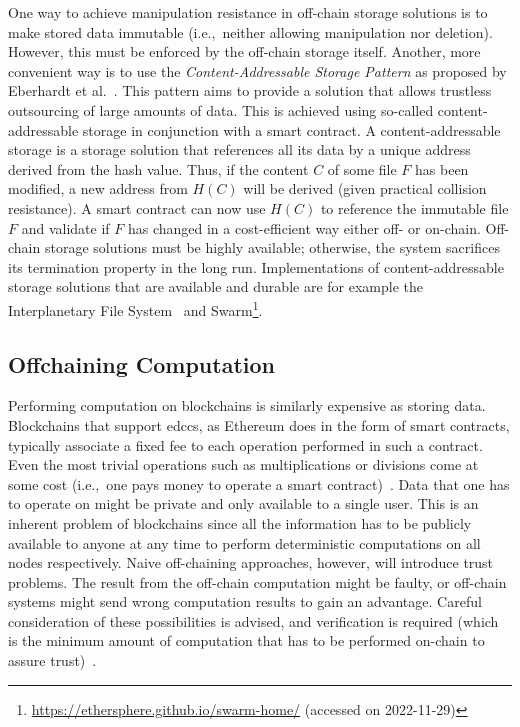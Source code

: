 One way to achieve manipulation resistance in off-chain storage solutions is to make stored data immutable (i.e.,\ neither allowing manipulation nor deletion). However, this must be enforced by the off-chain storage itself. Another, more convenient way is to use the \textit{Content-Addressable Storage Pattern} as proposed by Eberhardt et al.~\cite{eberhardt17off_block}. This pattern aims to provide a solution that allows trustless outsourcing of large amounts of data. This is achieved using so-called content-addressable storage in conjunction with a smart contract. A content-addressable storage is a storage solution that references all its data by a unique address derived from the hash value. Thus, if the content $C$ of some file $F$ has been modified, a new address from $H(C)$ will be derived (given practical collision resistance). A smart contract can now use $H(C)$ to reference the immutable file $F$ and validate if $F$ has changed in a cost-efficient way either off- or on-chain. Off-chain storage solutions must be highly available; otherwise, the system sacrifices its termination property in the long run. Implementations of content-addressable storage solutions that are available and durable are for example the Interplanetary File System~\cite{interplanetary_file_system} and Swarm\footnote{\url{https://ethersphere.github.io/swarm-home/} (accessed on 2022-11-29)}.


\subsection{Offchaining Computation}
\label{sec:background:on_vs_off_chain:offchaining_computation}
Performing computation on blockchains is similarly expensive as storing data. Blockchains that support \glspl{edcc}, as Ethereum does in the form of smart contracts, typically associate a fixed fee to each operation performed in such a contract. Even the most trivial operations such as multiplications or divisions come at some cost (i.e.,\ one pays money to operate a smart contract)~\cite{ethereum_yellow_paper}. Data that one has to operate on might be private and only available to a single user. This is an inherent problem of blockchains since all the information has to be publicly available to anyone at any time to perform deterministic computations on all nodes respectively. Naive off-chaining approaches, however, will introduce trust problems. The result from the off-chain computation might be faulty, or off-chain systems might send wrong computation results to gain an advantage. Careful consideration of these possibilities is advised, and verification is required (which is the minimum amount of computation that has to be performed on-chain to assure trust)~\cite{eberhardt18off_model_approac_off_comput}.

